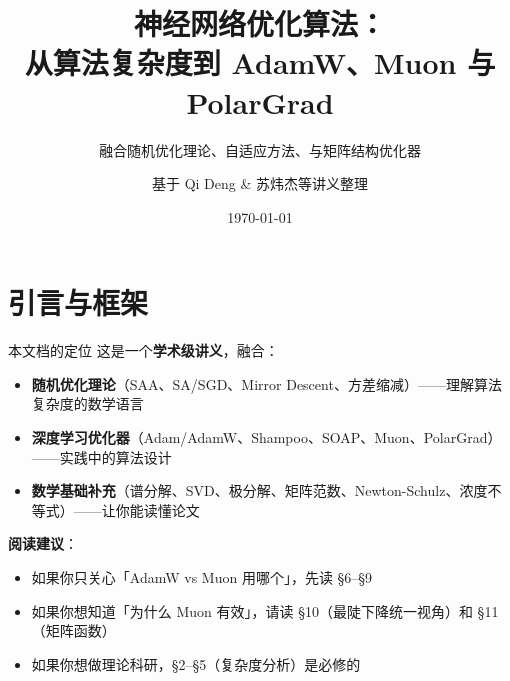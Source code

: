 \documentclass[aspectratio=169,10pt]{ctexbeamer}
\title[优化器与复杂度]{神经网络优化算法：\\[0.3em] 从算法复杂度到 AdamW、Muon 与 PolarGrad}
\subtitle{融合随机优化理论、自适应方法、与矩阵结构优化器}
\author{基于 Qi Deng \& 苏炜杰等讲义整理}
\date{\today}
\begin{document}
\begin{frame}
  \titlepage
\end{frame}

\section{引言与框架}

\begin{frame}{本文档的定位}
这是一个\textbf{学术级讲义}，融合：
\begin{itemize}
  \item \textbf{随机优化理论}（SAA、SA/SGD、Mirror Descent、方差缩减）——理解算法复杂度的数学语言
  \item \textbf{深度学习优化器}（Adam/AdamW、Shampoo、SOAP、Muon、PolarGrad）——实践中的算法设计
  \item \textbf{数学基础补充}（谱分解、SVD、极分解、矩阵范数、Newton-Schulz、浓度不等式）——让你能读懂论文
\end{itemize}

\vspace{0.3cm}
\textbf{阅读建议}：
\begin{itemize}
  \item 如果你只关心「AdamW vs Muon 用哪个」，先读 \S6--\S9
  \item 如果你想知道「为什么 Muon 有效」，请读 \S10（最陡下降统一视角）和 \S11（矩阵函数）
  \item 如果你想做理论科研，\S2--\S5（复杂度分析）是必修的
\end{itemize}
\end{frame}
\end{document}
